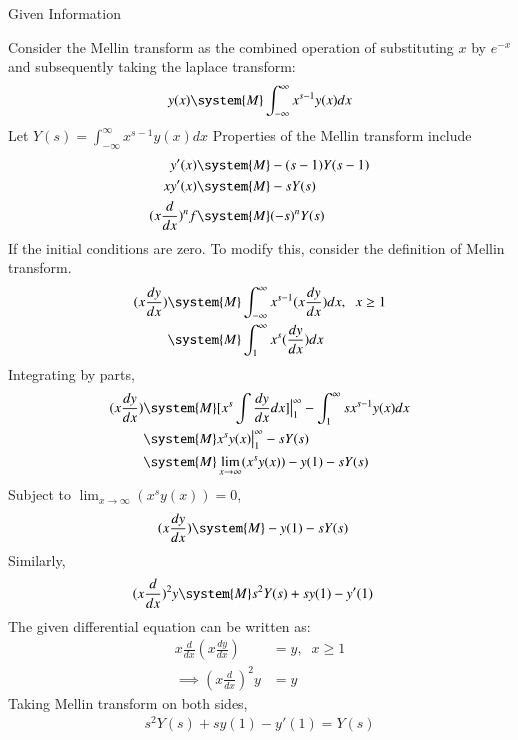 \documentclass[journal,12pt,twocolumn]{IEEEtran}
\theoremstyle{remark}
\begin{document}
\solution
\begin{table}[h]
    \centering
    
    \caption{Given Information} \label{gateME49.tab:1}
\end{table}
Consider the Mellin transform as the combined operation of substituting $x$ by $e^{-x}$ and subsequently taking the laplace transform: 
\begin{align}
    y(x)\system{M}\int_{-\infty}^{\infty} x^{s-1}y(x){dx} 
\end{align}
Let $Y(s)=\int_{-\infty}^{\infty} x^{s-1}y(x){dx} $
Properties of the Mellin transform include 
\begin{align}
    y'(x) &\system{M} -(s-1)Y(s-1)\\
    xy'(x) &\system{M} -s Y(s)\\
    (x\frac{d}{dx})^nf&\system{M} (-s)^nY(s) 
\end{align}
If the initial conditions are zero. To modify this, consider the definition of Mellin transform. 
\begin{align}
    (x\frac{dy}{dx}) &\system{M} \int_{-\infty}^{\infty} x^{s-1}(x\frac{dy}{dx}){dx}, \;\;x\geq1\\ 
    &\system{M} \int_{1}^{\infty} x^{s}(\frac{dy}{dx}){dx}
\end{align} 
Integrating by parts, 
\begin{align}
    (x\frac{dy}{dx}) &\system{M} [x^s\int \frac{dy}{dx}dx ]\big{|}_1 ^{\infty}-\int_1^{\infty} sx^{s-1}y(x)dx\\
    &\system{M} x^sy(x)\big{|}_1^{\infty} -sY(s)\\
    &\system{M} \lim_{x\rightarrow{\infty}} (x^s y(x))-y(1)-sY(s)
\end{align} 
Subject to $\lim_{x\rightarrow{\infty}} (x^s y(x))=0$, 
\begin{align}
    (x\frac{dy}{dx}) &\system{M} -y(1)-sY(s)
\end{align}
Similarly, 
\begin{align}
    (x\frac{d}{dx})^2 y &\system {M} s^2Y(s)+sy(1)-y'(1)
\end{align}
The given differential equation can be written as: 
\begin{align}
    x\frac{d}{dx}(x\frac{dy}{dx})&=y,\;\;x\geq 1\\
    \implies (x\frac{d}{dx})^2y&=y
\end{align}
Taking Mellin transform on both sides, 
\begin{align}
    s^2Y(s)+sy(1)-y'(1)=Y(s)
\end{align}
\end{document}
